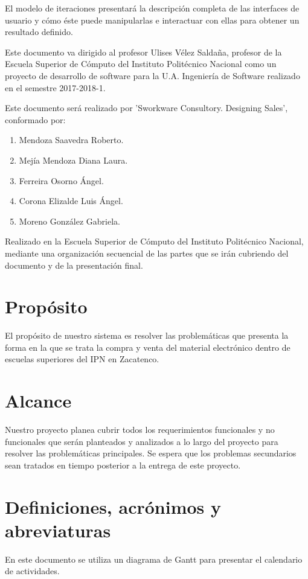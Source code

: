 El modelo de iteraciones presentará la descripción completa de las interfaces de usuario y cómo éste puede manipularlas e interactuar con ellas para obtener un resultado definido.
	
Este documento va dirigido al profesor Ulises Vélez Saldaña, profesor de la Escuela Superior de Cómputo del Instituto Politécnico Nacional como un proyecto de desarrollo de software para la U.A. Ingeniería de Software realizado en el semestre 2017-2018-1.
	
Este documento será realizado por ’Sworkware Consultory. Designing Sales’, conformado por: 
\begin{enumerate}
	\item Mendoza Saavedra Roberto.
	\item Mejía Mendoza Diana Laura.
	\item Ferreira Osorno Ángel.
	\item Corona Elizalde Luis Ángel.
	\item Moreno González Gabriela.
\end{enumerate}

Realizado en la Escuela Superior de Cómputo del Instituto Politécnico Nacional, mediante una organización secuencial de las partes que se irán cubriendo del documento y de la presentación final.

\section{Propósito}
El propósito de nuestro sistema es resolver las problemáticas que presenta la forma en la que se trata la compra y venta del material electrónico dentro de escuelas superiores del IPN en Zacatenco.

\section{Alcance}
Nuestro proyecto planea cubrir todos los requerimientos funcionales y no funcionales que serán planteados y analizados a lo largo del proyecto para resolver las problemáticas principales. Se espera que los problemas secundarios sean tratados en tiempo posterior a la entrega de este proyecto.

\section{Definiciones, acrónimos y abreviaturas}
En este documento se utiliza un diagrama de Gantt para presentar el calendario de actividades.
	
